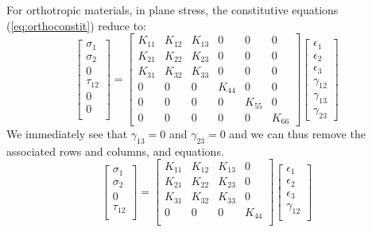 \documentclass{article}
\begin{document}
For orthotropic materials, in plane stress, the constitutive
equations (\cref{eq:orthoconstit}) reduce to:
\begin{equation}
\left[
\begin{matrix}
\sigma_{1}\\
\sigma_{2}\\
0\\
\tau_{12}\\
0\\
0\\
\end{matrix}
\right]
=
\left[
\begin{matrix}
K_{11} & K_{12} & K_{13} & 0 & 0 & 0 \\
K_{21} & K_{22} & K_{23} & 0 & 0 & 0 \\
K_{31} & K_{32} & K_{33} & 0 & 0 & 0 \\
0 & 0 & 0 & K_{44} & 0 & 0 \\
0 & 0 & 0 & 0 & K_{55} & 0 \\
0 & 0 & 0 & 0 & 0 & K_{66}
\end{matrix}
\right]
\left[
\begin{matrix}
\epsilon_{1}\\
\epsilon_{2}\\
\epsilon_{3}\\
\gamma_{12}\\
\gamma_{13}\\
\gamma_{23}
\end{matrix}
\right]
\end{equation}
We immediately see that $\gamma_{13} = 0$ and $\gamma_{23} = 0$ and we can thus remove the associated rows and columns, and equations.
\begin{equation}
\left[
\begin{matrix}
\sigma_{1}\\
\sigma_{2}\\
0\\
\tau_{12}\\
\end{matrix}
\right]
=
\left[
\begin{matrix}
K_{11} & K_{12} & K_{13} & 0 \\
K_{21} & K_{22} & K_{23} & 0 \\
K_{31} & K_{32} & K_{33} & 0 \\
0 & 0 & 0 & K_{44} \\
\end{matrix}
\right]
\left[
\begin{matrix}
\epsilon_{1}\\
\epsilon_{2}\\
\epsilon_{3}\\
\gamma_{12}\\
\end{matrix}
\right]
\end{equation}
\end{document}
